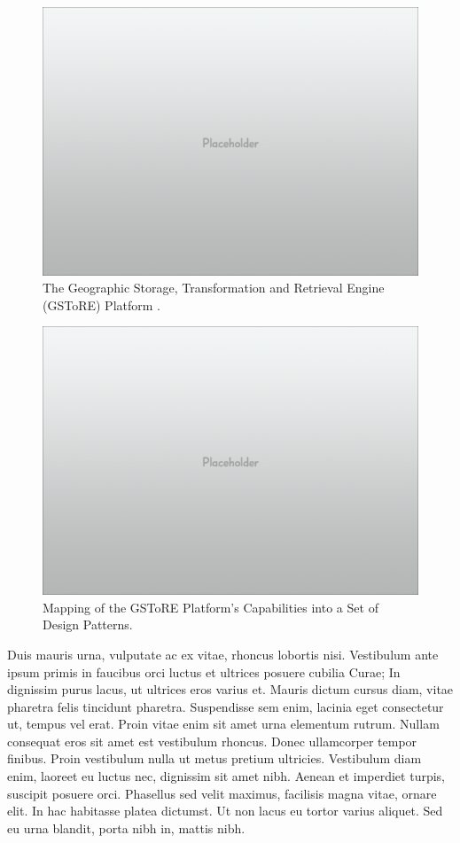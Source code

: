 \documentclass[final]{beamer}
\begin{document}
\begin{frame}[t]
\begin{multicols}{3}
\begin{figure}[htbp]
\centering
\includegraphics{placeholder.png}
\caption{The Geographic Storage, Transformation and Retrieval Engine
(GSToRE) Platform .}
\end{figure}

\begin{figure}[htbp]
\centering
\includegraphics{placeholder.png}
\caption{Mapping of the GSToRE Platform's Capabilities into a Set of
Design Patterns.}
\end{figure}

Duis mauris urna, vulputate ac ex vitae, rhoncus lobortis nisi.
Vestibulum ante ipsum primis in faucibus orci luctus et ultrices posuere
cubilia Curae; In dignissim purus lacus, ut ultrices eros varius et.
Mauris dictum cursus diam, vitae pharetra felis tincidunt pharetra.
Suspendisse sem enim, lacinia eget consectetur ut, tempus vel erat.
Proin vitae enim sit amet urna elementum rutrum. Nullam consequat eros
sit amet est vestibulum rhoncus. Donec ullamcorper tempor finibus. Proin
vestibulum nulla ut metus pretium ultricies. Vestibulum diam enim,
laoreet eu luctus nec, dignissim sit amet nibh. Aenean et imperdiet
turpis, suscipit posuere orci. Phasellus sed velit maximus, facilisis
magna vitae, ornare elit. In hac habitasse platea dictumst. Ut non lacus
eu tortor varius aliquet. Sed eu urna blandit, porta nibh in, mattis
nibh.


\end{multicols}
\end{frame}
\end{document}
